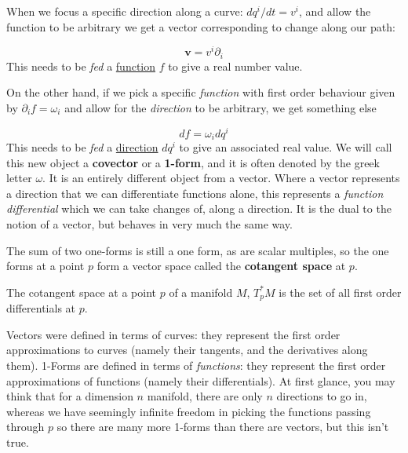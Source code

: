 	When we focus a specific direction along a curve: $dq^i/dt = v^i$, and allow the function to be arbitrary we get a vector corresponding to change along our path:
	
	\begin{equation}
		\mathbf v  = v^i \partial_i
	\end{equation}
	This needs to be \emph{fed} a \underline{function} $f$ to give a real number value.
	
	On the other hand, if we pick a specific \emph{function} with first order behaviour given by $\partial_i f = \omega_i$ and allow for the \emph{direction} to be arbitrary, we get something else
	
	\begin{equation}
		df = \omega_i dq^i
	\end{equation}
	This needs to be \emph{fed} a \underline{direction} $dq^i$ to give an associated real value. We will call this new object a \textbf{covector} or a \textbf{1-form}, and it is often denoted by the greek letter $\omega$. It is an entirely different object from a vector. Where a vector represents a direction that we can differentiate functions alone, this represents a \emph{function differential} which we can take changes of, along a direction. It is the dual to the notion of a vector, but behaves in very much the same way.
	
	The sum of two one-forms is still a one form, as are scalar multiples, so the one forms at a point $p$ form a vector space called the \textbf{cotangent space} at $p$.
	
	\begin{defn}
		The cotangent space at a point $p$ of a manifold $M$, $T_p^* M$ is the set of all first order differentials at $p$.
	\end{defn}
	
	Vectors were defined in terms of curves: they represent the first order approximations to curves (namely their tangents, and the derivatives along them). 1-Forms are defined in terms of \emph{functions}: they represent the first order approximations of functions (namely their differentials). At first glance, you may think that for a dimension $n$ manifold, there are only $n$ directions to go in, whereas we have seemingly infinite freedom in picking the functions passing through $p$ so there are many more 1-forms than there are vectors, but this isn't true.
	
